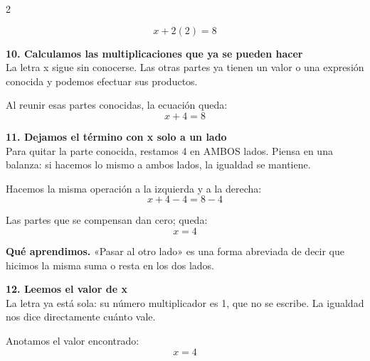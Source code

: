\documentclass[11pt,a4paper,landscape]{article}
\begin{document}
\begin{multicols*}{2}
\begin{minipage}{\linewidth}
\[x + 2\left(2\right)=8\]
\end{minipage}\par\medskip
\noindent\begin{minipage}{\linewidth}\textbf{10. Calculamos las multiplicaciones que ya se pueden hacer}\\[2pt]La letra x sigue sin conocerse. Las otras partes ya tienen un valor o una expresión conocida y podemos efectuar sus productos.
\par{}\par\smallskip
\par\smallskip Al reunir esas partes conocidas, la ecuación queda:
\[x + 4=8\]
\end{minipage}\par\medskip
\noindent\begin{minipage}{\linewidth}\textbf{11. Dejamos el término con x solo a un lado}\\[2pt]Para quitar la parte conocida, restamos 4 en AMBOS lados. Piensa en una balanza: si hacemos lo mismo a ambos lados, la igualdad se mantiene.
\par\smallskip Hacemos la misma operación a la izquierda y a la derecha:
\[x + 4 - 4=8 - 4\]
\par\smallskip Las partes que se compensan dan cero; queda:
\[x=4\]
\par\smallskip\textbf{Qué aprendimos.} «Pasar al otro lado» es una forma abreviada de decir que hicimos la misma suma o resta en los dos lados.
\end{minipage}\par\medskip
\noindent\begin{minipage}{\linewidth}\textbf{12. Leemos el valor de x}\\[2pt]La letra ya está sola: su número multiplicador es 1, que no se escribe. La igualdad nos dice directamente cuánto vale.
\par\smallskip Anotamos el valor encontrado:
\[x=4\]
\end{minipage}\par\medskip

\end{multicols*}
\end{document}

